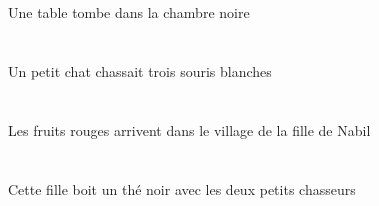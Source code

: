 \begin{exe}
    \DEFSgOblP{}   \noirBSgP{}   \chambreBSgOblP{}   \DANSP{}   \INDSgAbsP{}   \tableDSgAbsP{}  \tomberViPrsDSgP{} \\
    \DEFSgOblG{}   \noirBSgG{}   \chambreBSgOblG{}   \DANSG{}   \INDSgAbsG{}   \tableDSgAbsG{}  \tomberViPrsDSgG{} \\
 Une table tombe dans la chambre noire
\ex\glll
   \INDSgErg{}   \petitDSg{}   \chatDSgErg{}   \INDPlAbs{}   \troisBPl{}   \blancBPl{}   \sourisBPlAbs{}  \chasserVtPstBPl{} \\
   \INDSgErgP{}   \petitDSgP{}   \chatDSgErgP{}   \INDPlAbsP{}   \troisBPlP{}   \blancBPlP{}   \sourisBPlAbsP{}  \chasserVtPstBPlP{} \\
   \INDSgErgG{}   \petitDSgG{}   \chatDSgErgG{}   \INDPlAbsG{}   \troisBPlG{}   \blancBPlG{}   \sourisBPlAbsG{}  \chasserVtPstBPlG{} \\
 Un petit chat chassait trois souris blanches
\ex\glll
   \DEFPlAbs{}   \rougeAPl{}   \fruitAPlAbs{}    \DEFSgObl{}    \DEFSgObl{}    \INDSgObl{}   \NabilDSgObl{}   \DE{}   \filleCSgObl{}   \DE{}   \villageCSgObl{}   \DANS{}  \arriverViPrsAPl{} \\
   \DEFPlAbsP{}   \rougeAPlP{}   \fruitAPlAbsP{}    \DEFSgOblP{}    \DEFSgOblP{}    \INDSgOblP{}   \NabilDSgOblP{}   \DEP{}   \filleCSgOblP{}   \DEP{}   \villageCSgOblP{}   \DANSP{}  \arriverViPrsAPlP{} \\
   \DEFPlAbsG{}   \rougeAPlG{}   \fruitAPlAbsG{}    \DEFSgOblG{}    \DEFSgOblG{}    \INDSgOblG{}   \NabilDSgOblG{}   \DEG{}   \filleCSgOblG{}   \DEG{}   \villageCSgOblG{}   \DANSG{}  \arriverViPrsAPlG{} \\
 Les fruits rouges arrivent dans le village de la fille de Nabil
\ex\glll
    \DEFDuObl{}   \petitCDu{}   \chasseurCDuObl{}   \AVEC{}   \DEMSgErg{}   \filleCSgErg{}   \INDSgAbs{}   \noirBSg{}   \theBSgAbs{}  \boireVtPrsBSg{} \\
    \DEFDuOblP{}   \petitCDuP{}   \chasseurCDuOblP{}   \AVECP{}   \DEMSgErgP{}   \filleCSgErgP{}   \INDSgAbsP{}   \noirBSgP{}   \theBSgAbsP{}  \boireVtPrsBSgP{} \\
    \DEFDuOblG{}   \petitCDuG{}   \chasseurCDuOblG{}   \AVECG{}   \DEMSgErgG{}   \filleCSgErgG{}   \INDSgAbsG{}   \noirBSgG{}   \theBSgAbsG{}  \boireVtPrsBSgG{} \\
 Cette fille boit un thé noir avec les deux petits chasseurs
\ex\glll
   \DEFDuAbs{}   \blancDDu{}   \chatDDuAbs{}    \DEFSgObl{}   \basDSg{}   \tableDSgObl{}   \SUR{}  \dormirViPrsDDu{} \\
   \DEFDuAbsP{}   \blancDDuP{}   \chatDDuAbsP{}    \DEFSgOblP{}   \basDSgP{}   \tableDSgOblP{}   \SURP{}  \dormirViPrsDDuP{} \\

\end{exe}
